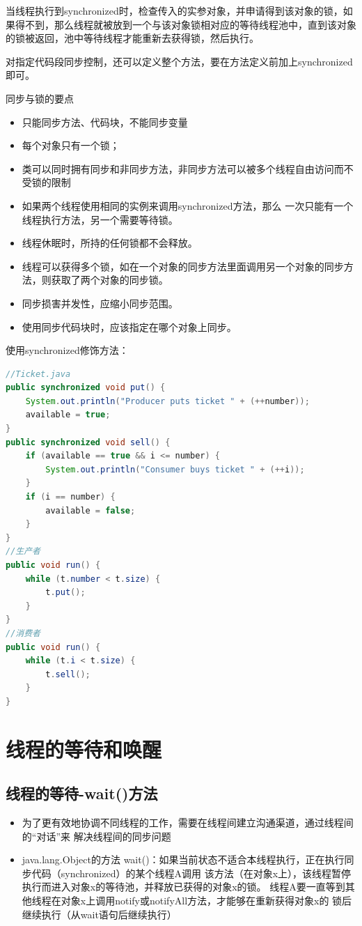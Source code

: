 \par 当线程执行到synchronized时，检查传入的实参对象，并申请得到该对象的锁，如果得不到，那么线程就被放到一个与该对象锁相对应的等待线程池中，直到该对象的锁被返回，池中等待线程才能重新去获得锁，然后执行。
\par 对指定代码段同步控制，还可以定义整个方法，要在方法定义前加上synchronized即可。
\par 同步与锁的要点
\begin{itemize}
	\item 只能同步方法、代码块，不能同步变量
	\item 每个对象只有一个锁；
	\item 类可以同时拥有同步和非同步方法，非同步方法可以被多个线程自由访问而不受锁的限制
	\item 如果两个线程使用相同的实例来调用synchronized方法，那么
	一次只能有一个线程执行方法，另一个需要等待锁。
	\item 线程休眠时，所持的任何锁都不会释放。
	\item 线程可以获得多个锁，如在一个对象的同步方法里面调用另一个对象的同步方法，则获取了两个对象的同步锁。
	\item 同步损害并发性，应缩小同步范围。
	\item 使用同步代码块时，应该指定在哪个对象上同步。
\end{itemize}
使用synchronized修饰方法：
\begin{lstlisting}[language=java]
//Ticket.java
public synchronized void put() {
	System.out.println("Producer puts ticket " + (++number));
	available = true;
}
public synchronized void sell() {
	if (available == true && i <= number) {
		System.out.println("Consumer buys ticket " + (++i));
	}
	if (i == number) {
		available = false;
	}
}
//生产者
public void run() {
	while (t.number < t.size) {
		t.put();
	}
}
//消费者
public void run() {
	while (t.i < t.size) {
		t.sell();
	}
}
\end{lstlisting}
\section{线程的等待和唤醒}
\subsection{线程的等待-wait()方法}
\begin{itemize}
	\item 为了更有效地协调不同线程的工作，需要在线程间建立沟通渠道，通过线程间的“对话”来
	解决线程间的同步问题
	\item java.lang.Object的方法
	\subitem wait()：如果当前状态不适合本线程执行，正在执行同步代码（synchronized）的某个线程A调用
	该方法（在对象x上），该线程暂停执行而进入对象x的等待池，并释放已获得的对象x的锁。
	线程A要一直等到其他线程在对象x上调用notify或notifyAll方法，才能够在重新获得对象x的
	锁后继续执行（从wait语句后继续执行）
\end{itemize}
